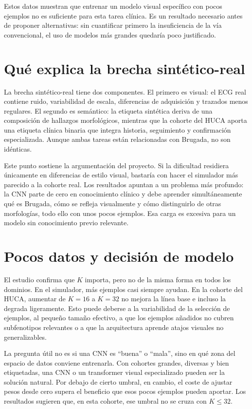 Estos datos muestran que entrenar un modelo visual específico con pocos ejemplos no es suficiente para esta tarea clínica. Es un resultado necesario antes de proponer alternativas: sin cuantificar primero la insuficiencia de la vía convencional, el uso de modelos más grandes quedaría poco justificado.

\section{Qué explica la brecha sintético-real}

La brecha sintético-real tiene dos componentes. El primero es visual: el ECG real contiene ruido, variabilidad de escala, diferencias de adquisición y trazados menos regulares. El segundo es semántico: la etiqueta sintética deriva de una composición de hallazgos morfológicos, mientras que la cohorte del HUCA aporta una etiqueta clínica binaria que integra historia, seguimiento y confirmación especializada. Aunque ambas tareas están relacionadas con Brugada, no son idénticas.

Este punto sostiene la argumentación del proyecto. Si la dificultad residiera únicamente en diferencias de estilo visual, bastaría con hacer el simulador más parecido a la cohorte real. Los resultados apuntan a un problema más profundo: la CNN parte de cero en conocimiento clínico y debe aprender simultáneamente qué es Brugada, cómo se refleja visualmente y cómo distinguirlo de otras morfologías, todo ello con unos pocos ejemplos. Esa carga es excesiva para un modelo sin conocimiento previo relevante.

\section{Pocos datos y decisión de modelo}

El estudio confirma que \(K\) importa, pero no de la misma forma en todos los dominios. En el simulador, más ejemplos casi siempre ayudan. En la cohorte del HUCA, aumentar de \(K=16\) a \(K=32\) no mejora la línea base e incluso la degrada ligeramente. Esto puede deberse a la variabilidad de la selección de ejemplos, al pequeño tamaño efectivo, a que los ejemplos añadidos no cubren subfenotipos relevantes o a que la arquitectura aprende atajos visuales no generalizables.

La pregunta útil no es si una CNN es ``buena'' o ``mala'', sino en qué zona del espacio de datos conviene entrenarla. Con cohortes grandes, diversas y bien etiquetadas, una CNN o un transformer visual especializado pueden ser la solución natural. Por debajo de cierto umbral, en cambio, el coste de ajustar pesos desde cero supera el beneficio que esos pocos ejemplos pueden aportar. Los resultados sugieren que, en esta cohorte, ese umbral no se cruza con \(K \leq 32\).

